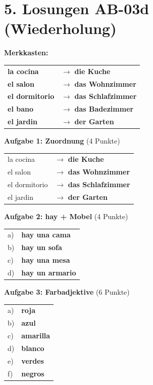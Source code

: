 \documentclass[11pt, a4paper]{article}
\newcommand{\fachfarbe}{spanisch}
\newcommand{\loesung}[1]{\textcolor{loesung}{\textbf{#1}}}
\newcommand{\es}[1]{\textcolor{\fachfarbe}{\textbf{#1}}}
\begin{document}

\section*{5. Losungen AB-03d (Wiederholung)}

\textbf{Merkkasten:}
\begin{tabular}{ll}
\es{la cocina} & $\rightarrow$ \loesung{die Kuche} \\
\es{el salon} & $\rightarrow$ \loesung{das Wohnzimmer} \\
\es{el dormitorio} & $\rightarrow$ \loesung{das Schlafzimmer} \\
\es{el bano} & $\rightarrow$ \loesung{das Badezimmer} \\
\es{el jardin} & $\rightarrow$ \loesung{der Garten} \\
\end{tabular}

\vspace{1em}

\textbf{Aufgabe 1: Zuordnung} (4 Punkte)
\begin{tabular}{ll}
la cocina & $\rightarrow$ \loesung{die Kuche} \\
el salon & $\rightarrow$ \loesung{das Wohnzimmer} \\
el dormitorio & $\rightarrow$ \loesung{das Schlafzimmer} \\
el jardin & $\rightarrow$ \loesung{der Garten} \\
\end{tabular}

\vspace{1em}

\textbf{Aufgabe 2: hay + Mobel} (4 Punkte)
\begin{tabular}{ll}
a) & \loesung{hay una cama} \\
b) & \loesung{hay un sofa} \\
c) & \loesung{hay una mesa} \\
d) & \loesung{hay un armario} \\
\end{tabular}

\vspace{1em}

\textbf{Aufgabe 3: Farbadjektive} (6 Punkte)
\begin{tabular}{ll}
a) & \loesung{roja} \\
b) & \loesung{azul} \\
c) & \loesung{amarilla} \\
d) & \loesung{blanco} \\
e) & \loesung{verdes} \\
f) & \loesung{negros} \\
\end{tabular}
\end{document}
